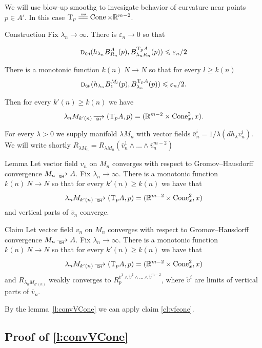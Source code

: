 \documentclass[a4paper,10pt]{article}
\begin{document}
We will use blow-up smoothg to invesigate behavior of curvature near points $p\in A'$.
In this case $\T_p\iso\Cone\times \RR^{m-2}$.






\begin{thm}{Construction}\label{constr}
Fix $\lambda_n\to\infty$. There is $\varepsilon_n\to 0$ so that

$$\text{\sc d}_{\text{\sf\tiny GH}}(h_{\lambda_n}B^A_{R_n}(p), B^{\text{\rm T}_p A}_{\lambda_n R_n}(p))\leqslant\varepsilon_n/2$$

There is a monotonic function
 $k(n)\:N\to N$
so that for every $l\ge k(n)$
$$\text{\sc d}_{\text{\sf\tiny GH}}(h_{\lambda_n}B^{M_l}_{1}(p), B^{\text{\rm T}_p A}_{\lambda_n}(p))\leqslant\varepsilon_n/2.$$

Then for every  $k'(n)\ge k(n)$ we have
$$\lambda_n M_{k'(n)}\GHto (\T_p A, p)=(\RR^{m-2}\times \Cone_x^2,x).$$
\end{thm}
For every $\lambda>0$ we supply manifold $\lambda M_n$
with vector fields
$\bar v_n^i=1/\lambda(d h_{\lambda}v_n^i)$. We will write shortly
$R_{\lambda M_n}=R_{\lambda M_n}(\bar v_n^1\wedge\dots\wedge\bar v_n^{m-2})$

\begin{thm}{Lemma}\label{l:convVCone}
Let vector field $v_n$ on $M_n$
converges with respect to Gromov--Hausdorff
convergence $M_n\GHto A$.
Fix $\lambda_n\to\infty$.
There is a monotonic function
 $k(n)\:N\to N$ so that  for every  $k'(n)\ge k(n)$
 we have that
$$\lambda_n M_{k'(n)}\GHto (\T_p A, p)=(\RR^{m-2}\times \Cone_x^2,x)$$
and
vertical parts of $\bar v_n$ converge.
\end{thm}

\begin{thm}{Claim}\label{cl:convVCone}
Let vector field $v_n$ on $M_n$
converges with respect to Gromov--Hausdorff
convergence $M_n\GHto A$.
Fix $\lambda_n\to\infty$.
There is a monotonic function
 $k(n)\:N\to N$ so that  for every  $k'(n)\ge k(n)$
 we have that
$$\lambda_n M_{k'(n)}\GHto (\T_p A, p)=(\RR^{m-2}\times \Cone_x^2,x)$$
and
$R_{\lambda_n M_{k'(n)}}$
weakly converges to $R^{\mathring{v}^1\wedge \mathring{v}^2\wedge\dots\wedge \mathring{v}^{m-2}}_p$,
where $\mathring{v}^i$ are limits of vertical parts of $\bar v_n$.
\end{thm}

 By the lemma~\ref{l:convVCone} we can apply claim \ref{cl:vfcone}.
\qeds




\subsection{Proof of \ref{l:convVCone}}
\end{document}
